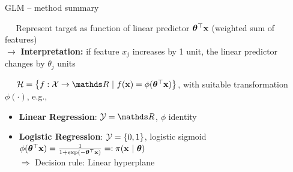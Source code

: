 \begin{frame}{GLM -- method summary}
     
 

 ~~ Represent target as function of linear predictor
$\bm{\theta}^\top \mathbf{x}$ (weighted sum of features)\\
$\rightarrow$ \textbf{Interpretation:} if feature $x_j$ increases by 1 unit, the linear predictor changes by $\theta_j$ units

\medskip
{} ~~
$\Hspace = \left\{f: \Xspace \to \R ~|~\fx = \phi(\thetav^\top \xv)\right\}$, 
with suitable transformation $\phi(\cdot)$, e.g.,

\begin{itemize}
  \item \textbf{Linear Regression}: $\Yspace = \R$, $\phi$ identity
  \item \textbf{Logistic Regression}: $\mathcal{Y} = \{0, 1\}$, logistic sigmoid $\phi(\bm{\theta}^\top \mathbf{x}) = \frac{1}{1 + \exp(- \bm{\theta}^\top \mathbf{x})} 
  =: \pi(\mathbf{x}~|~ \bm{\theta})$\\
  $\Rightarrow$ Decision rule: Linear hyperplane
\end{itemize}



\end{frame}
